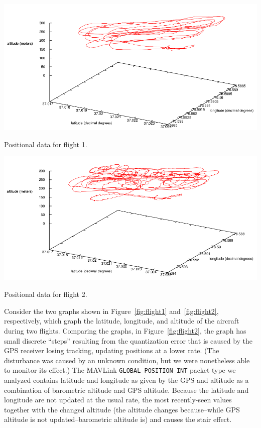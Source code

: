 \begin{myfig}[ht!]
  \centering
    \includegraphics[width=1\textwidth]{Figs/flight1.png}
    \caption{Positional data for flight 1.\label{fig:flight1}}
\end{myfig}%
\begin{myfig}[ht!]
 \centering
    \includegraphics[width=1\textwidth]{Figs/flight3.png}
    \caption{Positional data for flight 2.\label{fig:flight2}}
\end{myfig}

\noindent
Consider the two graphs shown in Figure~\ref{fig:flight1}
and~\ref{fig:flight2}, respectively, which graph the latitude, longitude, and
altitude of the aircraft during two flights.  Comparing the graphs, in
Figure~\ref{fig:flight2}, the graph has small discrete ``steps'' resulting from
the quantization error that is caused by the GPS receiver losing tracking,
updating positions at a lower rate.  (The disturbance was caused by an unknown
condition, but we were nonetheless able to monitor its effect.)  The MAVLink
{\small \tt GLOBAL\_POSITION\_INT} packet type we analyzed contains latitude and
longitude as given by the GPS and altitude as a combination of barometric
altitude and GPS altitude.  Because the latitude and longitude are not updated
at the usual rate, the most recently-seen values together with the changed
altitude (the altitude changes because--while GPS altitude is not
updated--barometric altitude is) and causes the stair effect.


